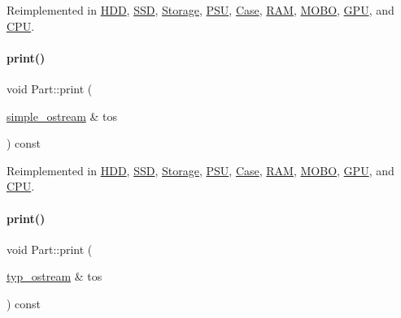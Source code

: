 Reimplemented in \mbox{\hyperlink{class_h_d_d_aca2c2583fa3304917905cd9185b64539}{H\+DD}}, \mbox{\hyperlink{class_s_s_d_ab07086e302f8be99cfa757583d2017a0}{S\+SD}}, \mbox{\hyperlink{class_storage_ab7ecf9e0777891b4e1a84bbf391a1cd4}{Storage}}, \mbox{\hyperlink{class_p_s_u_a81c74aa3a327003c58b89ca2b8602c1d}{P\+SU}}, \mbox{\hyperlink{class_case_ae179519844b825815f4accddafae13b6}{Case}}, \mbox{\hyperlink{class_r_a_m_a11a874dd6cf99454efd6b7a1d20a3737}{R\+AM}}, \mbox{\hyperlink{class_m_o_b_o_a4c78cec3a2a3e4d4480855622f50bd06}{M\+O\+BO}}, \mbox{\hyperlink{class_g_p_u_acfa9ab35cdf1c25c324fc39c6ffc2412}{G\+PU}}, and \mbox{\hyperlink{class_c_p_u_a0aea700bac0896b9e4434770737078d0}{C\+PU}}.

\mbox{\label{class_part_aa602d876151b63db72cf8f666847a8cd}} 
\paragraph{\texorpdfstring{print()}{print()}\hspace{0.1cm}{\footnotesize\ttfamily [3/4]}}
{\footnotesize\ttfamily void Part\+::print (\begin{DoxyParamCaption}\item[{\mbox{\hyperlink{structsimple__ostream}{simple\+\_\+ostream}} \&}]{tos }\end{DoxyParamCaption}) const\hspace{0.3cm}{\ttfamily [virtual]}}



Reimplemented in \mbox{\hyperlink{class_h_d_d_a0e48767713740f3ec7dafd907d3570b1}{H\+DD}}, \mbox{\hyperlink{class_s_s_d_a7efed56d8590399c61d8eefca9295c91}{S\+SD}}, \mbox{\hyperlink{class_storage_a53fc5b4814df41517b9f2be8dcef605e}{Storage}}, \mbox{\hyperlink{class_p_s_u_a57f14e0dee163f33d01cdbb159b6d9d6}{P\+SU}}, \mbox{\hyperlink{class_case_a580b6870ea256cab7e7eee36820803e7}{Case}}, \mbox{\hyperlink{class_r_a_m_ac2d5a8bd858289b6679e429bbe15fb20}{R\+AM}}, \mbox{\hyperlink{class_m_o_b_o_a01fed4470cbf8c58f86426aa8f52b225}{M\+O\+BO}}, \mbox{\hyperlink{class_g_p_u_a27cb964d5ce05efa75cb65d836b922e1}{G\+PU}}, and \mbox{\hyperlink{class_c_p_u_a2f130a0263e32387554c128aedb6f9ed}{C\+PU}}.

\mbox{\label{class_part_ab6396030e8b7a724731a8b54bd4942fc}} 
\paragraph{\texorpdfstring{print()}{print()}\hspace{0.1cm}{\footnotesize\ttfamily [4/4]}}
{\footnotesize\ttfamily void Part\+::print (\begin{DoxyParamCaption}\item[{\mbox{\hyperlink{structtyp__ostream}{typ\+\_\+ostream}} \&}]{tos }\end{DoxyParamCaption}) const\hspace{0.3cm}{\ttfamily [virtual]}}



